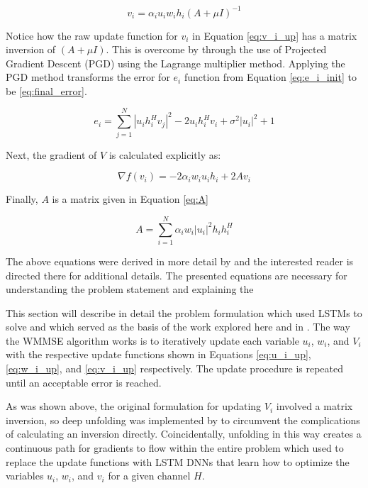 \documentclass[journal]{IEEEtran}
\begin{document}
\begin{equation}
v_i = \alpha_i u_i w_i h_i(A + \mu I)^{-1}
\label{eq:v_i_up}
\end{equation}

Notice how the raw update function for $v_i$ in Equation \ref{eq:v_i_up} has a matrix inversion of $(A + \mu I)$. This is overcome by \cite{Deep_Unfolding} through the use of Projected Gradient Descent (PGD) using the Lagrange multiplier method. Applying the PGD method transforms the error for $e_i$ function from Equation \ref{eq:e_i_init} to be \ref{eq:final_error}.

\begin{equation}
e_i = \sum^{N}_{j=1}|u_i h_i^H v_j|^2 - 2u_ih_i^Hv_i + \sigma^2|u_i|^2 + 1
\label{eq:final_error}
\end{equation}

Next, the gradient of $V$ is calculated explicitly as:

\begin{equation}
\nabla f(v_i) = -2\alpha_i w_i u_i h_i + 2Av_i
\label{eq:update_V}
\end{equation}

Finally, $A$ is a matrix given in Equation \ref{eq:A}

\begin{equation}
A = \sum^{N}_{i=1}\alpha_i w_i |u_i|^2h_i h^H_i
\label{eq:A}
\end{equation}

The above equations were derived in more detail by \cite{Deep_Unfolding} and the interested reader is directed there for additional details. The presented equations are necessary for understanding the problem statement and explaining the 

This section will describe in detail the problem formulation which \cite{LSTM_Net} used LSTMs to solve and which served as the basis of the work explored here and in \cite{LSTM_Net}. The way the WMMSE algorithm works is to iteratively update each variable $u_i$, $w_i$, and $V_i$ with the respective update functions shown in Equations \ref{eq:u_i_up}, \ref{eq:w_i_up}, and \ref{eq:v_i_up} respectively. The update procedure is repeated until an acceptable error is reached. 

As was shown above, the original formulation for updating $V_i$ involved a matrix inversion, so deep unfolding was implemented by \cite{Deep_Unfolding} to circumvent the complications of calculating an inversion directly. Coincidentally, unfolding in this way creates a continuous path for gradients to flow within the entire problem which \cite{LSTM_Net} used to replace the update functions with LSTM DNNs that learn how to optimize the variables $u_i$, $w_i$, and $v_i$ for a given channel $H$.
\end{document}
